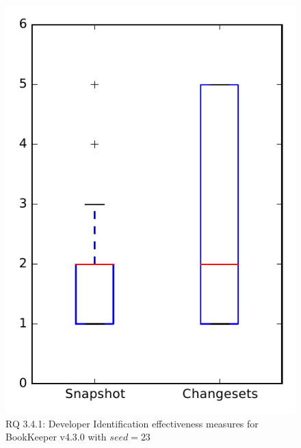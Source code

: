 
\begin{figure}
\centering
\includegraphics[height=0.4\textheight]{figures/dit_seed/rq1_bookkeeper_23}
\caption{RQ 3.4.1: Developer Identification effectiveness measures for BookKeeper v4.3.0 with $seed=23$}
\label{fig:dit_seed:rq1:bookkeeper}
\end{figure}
